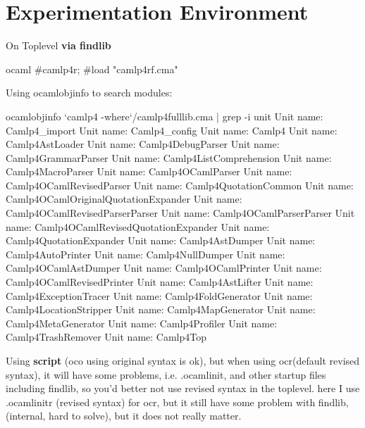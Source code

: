 \section{Experimentation Environment}

On Toplevel {\bf via findlib}
\begin{bluecode}
ocaml
#camlp4r;
#load "camlp4rf.cma"
\end{bluecode}

Using ocamlobjinfo to search modules:     
\begin{bluetext}
ocamlobjinfo `camlp4 -where`/camlp4fulllib.cma | grep -i unit
Unit name: Camlp4_import
Unit name: Camlp4_config
Unit name: Camlp4
Unit name: Camlp4AstLoader
Unit name: Camlp4DebugParser
Unit name: Camlp4GrammarParser
Unit name: Camlp4ListComprehension
Unit name: Camlp4MacroParser
Unit name: Camlp4OCamlParser
Unit name: Camlp4OCamlRevisedParser
Unit name: Camlp4QuotationCommon
Unit name: Camlp4OCamlOriginalQuotationExpander
Unit name: Camlp4OCamlRevisedParserParser
Unit name: Camlp4OCamlParserParser
Unit name: Camlp4OCamlRevisedQuotationExpander
Unit name: Camlp4QuotationExpander
Unit name: Camlp4AstDumper
Unit name: Camlp4AutoPrinter
Unit name: Camlp4NullDumper
Unit name: Camlp4OCamlAstDumper
Unit name: Camlp4OCamlPrinter
Unit name: Camlp4OCamlRevisedPrinter
Unit name: Camlp4AstLifter
Unit name: Camlp4ExceptionTracer
Unit name: Camlp4FoldGenerator
Unit name: Camlp4LocationStripper
Unit name: Camlp4MapGenerator
Unit name: Camlp4MetaGenerator
Unit name: Camlp4Profiler
Unit name: Camlp4TrashRemover
Unit name: Camlp4Top
\end{bluetext}


Using \textbf{script} (oco using original syntax is ok), but when
using ocr(default revised syntax), it will have some problems,
i.e. .ocamlinit, and other startup files including findlib, so you'd
better not use revised syntax in the toplevel. here I use
.ocamlinitr (revised syntax) for ocr, but it still have some problem
with findlib, (internal, hard to solve), but it does not really matter.




